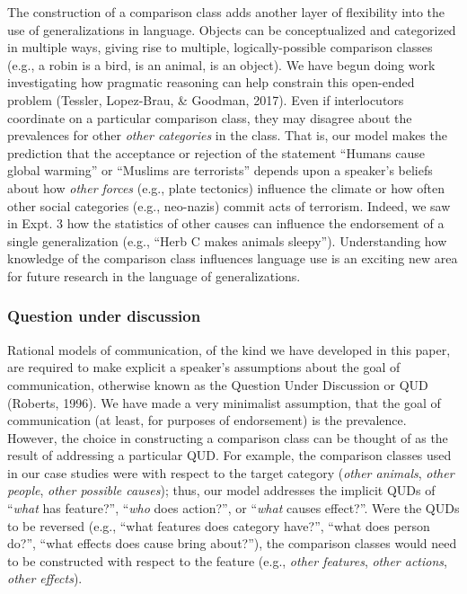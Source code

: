 \documentclass[english,floatsintext,man]{apa6}
\theoremstyle{definition}
\theoremstyle{definition}
\theoremstyle{definition}
\theoremstyle{remark}
\begin{document}
The construction of a comparison class adds another layer of flexibility
into the use of generalizations in language. Objects can be
conceptualized and categorized in multiple ways, giving rise to
multiple, logically-possible comparison classes (e.g., a robin is a
bird, is an animal, is an object). We have begun doing work
investigating how pragmatic reasoning can help constrain this open-ended
problem (Tessler, Lopez-Brau, \& Goodman, 2017). Even if interlocutors
coordinate on a particular comparison class, they may disagree about the
prevalences for other \emph{other categories} in the class. That is, our
model makes the prediction that the acceptance or rejection of the
statement \enquote{Humans cause global warming} or \enquote{Muslims are
terrorists} depends upon a speaker's beliefs about how \emph{other
forces} (e.g., plate tectonics) influence the climate or how often other
social categories (e.g., neo-nazis) commit acts of terrorism. Indeed, we
saw in Expt. 3 how the statistics of other causes can influence the
endorsement of a single generalization (e.g., \enquote{Herb C makes
animals sleepy}). Understanding how knowledge of the comparison class
influences language use is an exciting new area for future research in
the language of generalizations.

\subsubsection{Question under
discussion}\label{question-under-discussion}

Rational models of communication, of the kind we have developed in this
paper, are required to make explicit a speaker's assumptions about the
goal of communication, otherwise known as the Question Under Discussion
or QUD (Roberts, 1996). We have made a very minimalist assumption, that
the goal of communication (at least, for purposes of endorsement) is the
prevalence. However, the choice in constructing a comparison class can
be thought of as the result of addressing a particular QUD. For example,
the comparison classes used in our case studies were with respect to the
target category (\emph{other animals}, \emph{other people}, \emph{other
possible causes}); thus, our model addresses the implicit QUDs of
\enquote{\emph{what} has feature?}, \enquote{\emph{who} does action?},
or \enquote{\emph{what} causes effect?}. Were the QUDs to be reversed
(e.g., \enquote{what features does category have?}, \enquote{what does
person do?}, \enquote{what effects does cause bring about?}), the
comparison classes would need to be constructed with respect to the
feature (e.g., \emph{other features}, \emph{other actions}, \emph{other
effects}).
\end{document}
